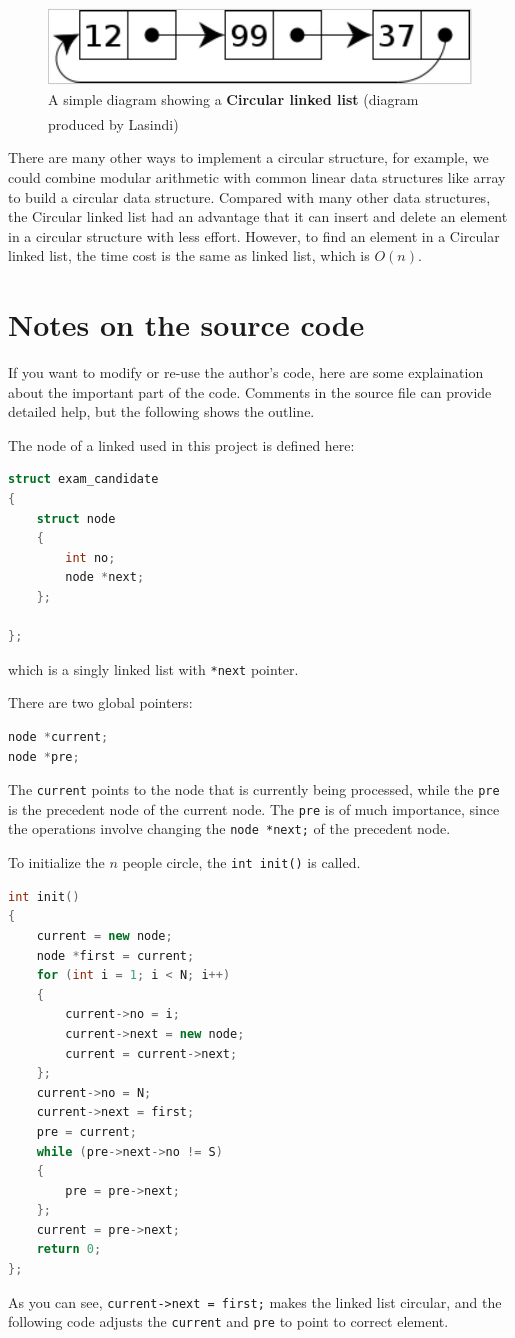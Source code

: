 \documentclass[cn,black,12pt,normal]{elegantnote}
\newcommand{\uct}[1]{\textsuperscript{\textsuperscript{\cite{#1}}}}
\begin{document}
\begin{figure}[H]
    \centering
    \includegraphics[width=1.0\linewidth]{image/ll_03.jpg}
    \caption{A simple diagram showing a \textbf{Circular linked list} (diagram produced by Lasindi)\uct{wiki:Linked_list}}
\end{figure}


There are many other ways to implement a circular structure, for example, we could combine modular arithmetic with common linear data structures like array to build a circular data structure. Compared with many other data structures, the Circular linked list had an advantage that it can insert and delete an element in a circular structure with less effort. However, to find an element in a Circular linked list, the time cost is the same as linked list, which is $O(n)$.


\section{Notes on the source code}

If you want to modify or re-use the author's code, here are some explaination about the important part of the code. Comments in the source file can provide detailed help, but the following shows the outline.

The node of a linked used in this project is defined here:
\begin{lstlisting}[language = C++]
struct exam_candidate
{
    struct node
    {
        int no;
        node *next;
    };
    
};
\end{lstlisting}
which is a singly linked list with \lstinline{*next} pointer.

There are two global pointers:
\begin{lstlisting}[language = C++]
node *current;
node *pre;
\end{lstlisting}
The \lstinline{current} points to the node that is currently being processed, while the \lstinline{pre} is the precedent node of the current node. The \lstinline{pre} is of much importance, since the operations involve changing the \lstinline{node *next;} of the precedent node.

To initialize the $n$ people circle, the \lstinline{int init()} is called.
\begin{lstlisting}[language = C++]
int init()
{
	current = new node;
	node *first = current;
	for (int i = 1; i < N; i++)
	{
		current->no = i;
		current->next = new node;
		current = current->next;
	};
	current->no = N;
	current->next = first;
	pre = current;
	while (pre->next->no != S)
	{
		pre = pre->next;
	};
	current = pre->next;
	return 0;
};
\end{lstlisting}
As you can see, \lstinline{current->next = first;} makes the linked list circular, and the following code adjusts the \lstinline{current} and \lstinline{pre} to point to correct element.
\end{document}
